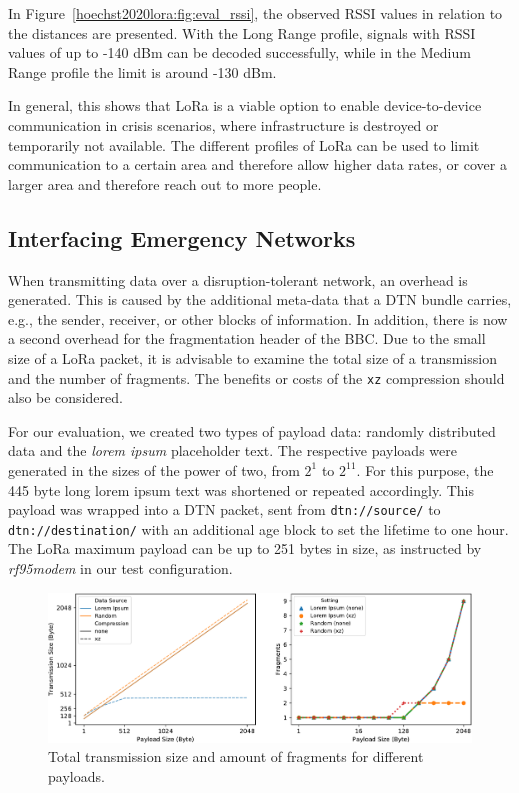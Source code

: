 In Figure~\ref{hoechst2020lora:fig:eval_rssi}, the observed RSSI values in relation to the distances are presented.
With the Long Range profile, signals with RSSI values of up to -140 dBm can be decoded successfully, while in the Medium Range profile the limit is around -130 dBm.

In general, this shows that LoRa is a viable option to enable device-to-device communication in crisis scenarios, where infrastructure is destroyed or temporarily not available.
The different profiles of LoRa can be used to limit communication to a certain area and therefore allow higher data rates, or cover a larger area and therefore reach out to more people. 


\subsection{Interfacing Emergency Networks}
When transmitting data over a disruption-tolerant network, an overhead is generated.
This is caused by the additional meta-data that a DTN bundle carries, e.g., the sender, receiver, or other blocks of information.
In addition, there is now a second overhead for the fragmentation header of the BBC.
Due to the small size of a LoRa packet, it is advisable to examine the total size of a transmission and the number of fragments.
The benefits or costs of the \texttt{xz} compression should also be considered.

For our evaluation, we created two types of payload data: randomly distributed data and the \emph{lorem ipsum} placeholder text.
The respective payloads were generated in the sizes of the power of two, from $2^1$ to $2^{11}$.
For this purpose, the 445 byte long lorem ipsum text was shortened or repeated accordingly.
This payload was wrapped into a DTN packet, sent from \texttt{dtn://source/} to \texttt{dtn://destination/} with an additional age block to set the lifetime to one hour.
The LoRa maximum payload can be up to 251 bytes in size, as instructed by \textit{rf95modem} in our test configuration.

\begin{figure}[ht!]
    \centering
    \includegraphics[width=\columnwidth]{gfx/dtn7-bbc-eval.pdf}
    \caption{Total transmission size and amount of fragments for different payloads.}
    \label{hoechst2020lora:fig:dtn7_bbc_eval}
\end{figure}

